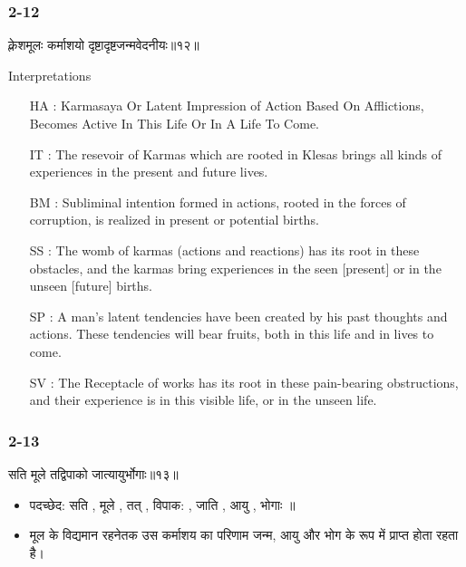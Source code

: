 \begin{frame}[fragile]\frametitle{2-12}
\begin{sanskrit}
क्लेशमूलः कर्माशयो दृष्टादृष्टजन्मवेदनीयः॥१२॥
\end{sanskrit}

Interpretations
\begin{itemize}
\item [HA]: Karmasaya Or Latent Impression of Action Based On Afflictions, Becomes Active In This Life Or In A Life To Come.
\item [IT]: The resevoir of Karmas which are rooted in Klesas brings all kinds of experiences in the present and future lives.
\item [BM]: Subliminal intention formed in actions, rooted in the forces of corruption, is realized in present or potential births.
\item [SS]: The womb of karmas (actions and reactions) has its root in these obstacles, and the karmas bring experiences in the seen [present] or in the unseen [future] births.
\item [SP]: A man’s latent tendencies have been created by his past thoughts and actions. These tendencies will bear fruits, both in this life and in lives to come.
\item [SV]: The Receptacle of works has its root in these pain-bearing obstructions, and their experience is in this visible life, or in the unseen life. 
\end{itemize}
	
\end{frame}

\begin{frame}[fragile]\frametitle{2-13}
\begin{sanskrit}
सति मूले तद्विपाको जात्यायुर्भोगाः॥१३॥
\end{sanskrit}

\begin{itemize}
\item पदच्छेद: सति , मूले , तत् , विपाक: , जाति , आयु , भोगाः ॥
\item मूल के विद्यमान रहनेतक उस कर्माशय का परिणाम जन्म, आयु और भोग के रूप में प्राप्त होता रहता है।
\end{itemize}
	
\end{frame}


